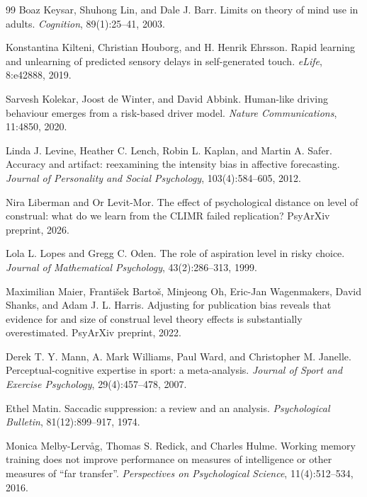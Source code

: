 \documentclass[11pt,a4paper]{article}
\theoremstyle{remark}
\begin{document}
\begin{thebibliography}{99}
Boaz Keysar, Shuhong Lin, and Dale J. Barr.
\newblock Limits on theory of mind use in adults.
\newblock \emph{Cognition}, 89(1):25--41, 2003.

Konstantina Kilteni, Christian Houborg, and H. Henrik Ehrsson.
\newblock Rapid learning and unlearning of predicted sensory delays in self-generated touch.
\newblock \emph{eLife}, 8:e42888, 2019.

Sarvesh Kolekar, Joost de Winter, and David Abbink.
\newblock Human-like driving behaviour emerges from a risk-based driver model.
\newblock \emph{Nature Communications}, 11:4850, 2020.

Linda J. Levine, Heather C. Lench, Robin L. Kaplan, and Martin A. Safer.
\newblock Accuracy and artifact: reexamining the intensity bias in affective forecasting.
\newblock \emph{Journal of Personality and Social Psychology}, 103(4):584--605, 2012.

Nira Liberman and Or Levit-Mor.
\newblock The effect of psychological distance on level of construal: what do we learn from the CLIMR failed replication?
\newblock PsyArXiv preprint, 2026.

Lola L. Lopes and Gregg C. Oden.
\newblock The role of aspiration level in risky choice.
\newblock \emph{Journal of Mathematical Psychology}, 43(2):286--313, 1999.

Maximilian Maier, Franti\v{s}ek Barto\v{s}, Minjeong Oh, Eric-Jan Wagenmakers, David Shanks, and Adam J. L. Harris.
\newblock Adjusting for publication bias reveals that evidence for and size of construal level theory effects is substantially overestimated.
\newblock PsyArXiv preprint, 2022.

Derek T. Y. Mann, A. Mark Williams, Paul Ward, and Christopher M. Janelle.
\newblock Perceptual-cognitive expertise in sport: a meta-analysis.
\newblock \emph{Journal of Sport and Exercise Psychology}, 29(4):457--478, 2007.

Ethel Matin.
\newblock Saccadic suppression: a review and an analysis.
\newblock \emph{Psychological Bulletin}, 81(12):899--917, 1974.

Monica Melby-Lerv\aa g, Thomas S. Redick, and Charles Hulme.
\newblock Working memory training does not improve performance on measures of intelligence or other measures of ``far transfer''.
\newblock \emph{Perspectives on Psychological Science}, 11(4):512--534, 2016.


\end{thebibliography}
\end{document}
